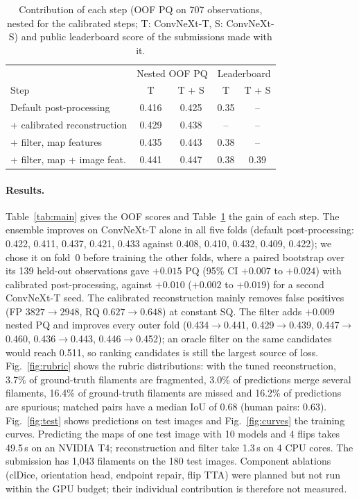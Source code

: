 \begin{table}[t]
  \caption{Contribution of each step (OOF PQ on 707 observations, nested
  for the calibrated steps; T: ConvNeXt-T, S: ConvNeXt-S) and public
  leaderboard score of the submissions made with it.}
  \label{tab:steps}
  \small
  \setlength{\tabcolsep}{4pt}
  \begin{tabular}{lcccc}
    \toprule
    & \multicolumn{2}{c}{Nested OOF PQ} & \multicolumn{2}{c}{Leaderboard} \\
    Step & T & T + S & T & T + S \\
    \midrule
    Default post-processing & 0.416 & 0.425 & 0.35 & -- \\
    + calibrated reconstruction & 0.429 & 0.438 & -- & -- \\
    + filter, map features & 0.435 & 0.443 & 0.38 & -- \\
    + filter, map + image feat. & 0.441 & 0.447 & 0.38 & 0.39 \\
    \bottomrule
  \end{tabular}
\end{table}

\paragraph{Results.}
Table~\ref{tab:main} gives the OOF scores and Table~\ref{tab:steps} the
gain of each step. The ensemble improves on ConvNeXt-T alone in all five
folds (default post-processing: 0.422, 0.411, 0.437, 0.421, 0.433 against
0.408, 0.410, 0.432, 0.409, 0.422); we chose it on fold~0 before training
the other folds, where a paired bootstrap over its 139 held-out observations
gave $+0.015$ PQ (95\% CI $+0.007$ to $+0.024$) with calibrated
post-processing, against $+0.010$ ($+0.002$ to $+0.019$) for a second
ConvNeXt-T seed. The calibrated reconstruction mainly removes false
positives (FP $3827\to2948$, RQ $0.627\to0.648$) at constant SQ. The filter
adds $+0.009$ nested PQ and improves every outer fold (0.434$\to$0.441,
0.429$\to$0.439, 0.447$\to$0.460, 0.436$\to$0.443, 0.446$\to$0.452); an
oracle filter on the same candidates would reach 0.511, so ranking
candidates is still the largest source of loss. Fig.~\ref{fig:rubric}
shows the rubric distributions: with the tuned reconstruction, 3.7\% of
ground-truth filaments are fragmented, 3.0\% of predictions merge several
filaments, 16.4\% of ground-truth filaments are missed and 16.2\% of
predictions are spurious; matched pairs have a median IoU of 0.68 (human
pairs: 0.63). Fig.~\ref{fig:test} shows predictions on test images and
Fig.~\ref{fig:curves} the training curves. Predicting the
maps of one test image with 10 models and 4 flips takes 49.5\,s on an
NVIDIA T4; reconstruction and filter take 1.3\,s on 4 CPU cores. The
submission has 1{,}043 filaments on the 180 test images.
Component ablations (clDice, orientation head, endpoint repair, flip TTA)
were planned but not run within the GPU budget; their individual
contribution is therefore not measured.

